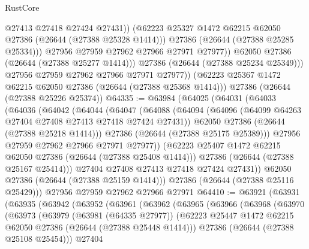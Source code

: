\begin{lexlean}{RustCore}
\begin{coremodule}
                      @27413
                      @27418
                      @27424
                      @27431))
                  (@62223 @25327 @1472 @62215 @62050 @27386 (@26644 (@27388 @25328 @1414)))
                  @27386
                  (@26644 (@27388 @25285 @25334)))
                @27956
                @27959
                @27962
                @27966
                @27971
                @27977))
            @62050
            @27386
            (@26644 (@27388 @25277 @1414)))
          @27386
          (@26644 (@27388 @25234 @25349)))
        @27956
        @27959
        @27962
        @27966
        @27971
        @27977))
    (@62223 @25367 @1472 @62215 @62050 @27386 (@26644 (@27388 @25368 @1414)))
    @27386
    (@26644 (@27388 @25226 @25374))
@64335 := @63984
    (@64025
      (@64031
        (@64033
          (@64036
            (@64042
              (@64044
                (@64047
                  (@64088
                    (@64094
                      (@64096 (@64099 @64263 @27404 @27408 @27413 @27418 @27424 @27431))
                      @62050
                      @27386
                      (@26644 (@27388 @25218 @1414)))
                    @27386
                    (@26644 (@27388 @25175 @25389)))
                  @27956
                  @27959
                  @27962
                  @27966
                  @27971
                  @27977))
              (@62223 @25407 @1472 @62215 @62050 @27386 (@26644 (@27388 @25408 @1414)))
              @27386
              (@26644 (@27388 @25167 @25414)))
            @27404
            @27408
            @27413
            @27418
            @27424
            @27431))
        @62050
        @27386
        (@26644 (@27388 @25159 @1414)))
      @27386
      (@26644 (@27388 @25116 @25429)))
    @27956
    @27959
    @27962
    @27966
    @27971
@64410 := @63921
    (@63931
      (@63935
        (@63942
          (@63952
            (@63961
              (@63962
                (@63965
                  (@63966
                    (@63968
                      (@63970
                        (@63973
                          (@63979
                            (@63981 (@64335 @27977))
                            (@62223
                              @25447
                              @1472
                              @62215
                              @62050
                              @27386
                              (@26644 (@27388 @25448 @1414)))
                            @27386
                            (@26644 (@27388 @25108 @25454)))
                          @27404

\end{coremodule}
\end{lexlean}
